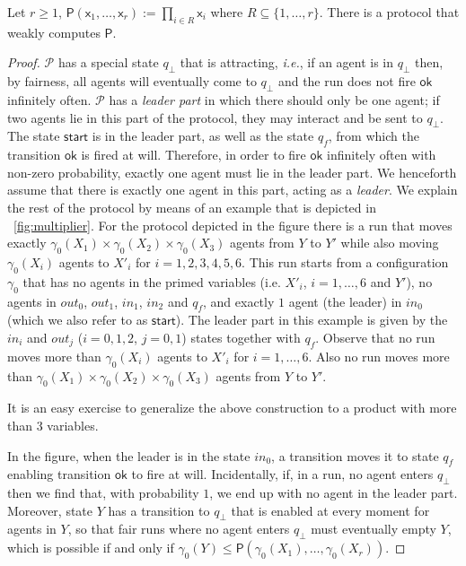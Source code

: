 \documentclass[10pt,a4paper]{article}
\renewcommand{\geq}{\geqslant}
\renewcommand{\leq}{\leqslant}
\newcommand{\prot}{\mathcal{P}}
\newcommand{\config}{\gamma}
\newcommand*{\apoly}{\mathsf{P}}
\newcommand{\varx}{\mathsf{x}}
\newcommand*{\startstate}{\mathsf{start}}
\newcommand*{\statex}[1]{X_{#1}}
\newcommand*{\okaction}{\mathsf{ok}}
\newcommand*{\okstate}{q_f}
\newcommand{\statey}{Y}
\newcommand{\cheatstate}{q_\bot}
\begin{document}
\begin{toappendix}
	\begin{lemma}
		\label{prot-weakly-computes-product}
		Let \(r \geq 1\), \(\apoly(\varx_1, \dots, \varx_r) := \prod_{i\in R} \varx_i\) where \(R\subseteq \{1,\ldots,r\}\).
		There is a protocol that weakly computes \(\apoly\).
	\end{lemma}
	\begin{proof}
		\(\prot\) has a special state \(\cheatstate\) that is attracting, \emph{i.e.}, if an agent is in \(\cheatstate\) then, by fairness, all agents will eventually come to \(\cheatstate\) and the run does not fire \(\okaction\) infinitely often.
		\(\prot\) has a \emph{leader part} in which there should only be one agent; if two agents lie in this part of the protocol, they may interact and be sent to \(\cheatstate\).
		The state \(\startstate\) is in the leader part, as well as the state \(\okstate\), from which the transition \(\okaction\) is fired at will.
		Therefore, in order to fire \(\okaction\) infinitely often with non-zero probability, exactly one agent must lie in the leader part.
		We henceforth assume that there is exactly one agent in this part, acting as a \emph{leader}.
		We explain the rest of the protocol by means of an example that is depicted in \figurename~\ref{fig:multiplier}.
		For the protocol depicted in the figure there is a run that moves exactly \(\gamma_0(X_1) \times \gamma_0(X_2) \times \gamma_0(X_3)\) agents from \(Y\) to \(Y'\) while also moving \(\gamma_0(X_i)\) agents to \(X'_i\) for \(i=1,2,3,4,5,6\).
		This run starts from a configuration \(\gamma_0\) that has no agents in the primed variables (i.e. \(X'_i\), \(i=1,\ldots,6\) and \(Y'\)), no agents in \(out_0\), \(out_1\), \(in_1\), \(in_2\) and \(q_f\), and exactly \(1\) agent (the leader) in \(in_0\) (which we also refer to as \(\startstate\)).
		The leader part in this example is given by the \(in_i\) and \(out_j\) (\(i=0,1,2\), \(j=0,1\)) states together with \(q_f\).
		Observe that no run moves more than \(\gamma_0(X_i)\) agents to \(X'_i\) for \(i=1,\ldots,6\).
		Also no run moves more than \(\gamma_0(X_1) \times \gamma_0(X_2) \times \gamma_0(X_3)\) agents from \(Y\) to \(Y'\).

		It is an easy exercise to generalize the above construction to a product with more than 3 variables.

		In the figure, when the leader is in the state \(in_0\), a transition moves it to state \(q_f\) enabling transition \(\okaction\) to fire at will.
		Incidentally, if, in a run, no agent enters \(\cheatstate\) then we find that, with probability \(1\), we end up with no agent in the leader part.
		Moreover, state \(Y\) has a transition to \(\cheatstate\) that is enabled at every moment for agents in \(Y\), so that fair runs where no agent enters \(\cheatstate\) must eventually empty \(Y\), which is possible if and only if \(\config_0(\statey) \leq \apoly(\config_0(\statex{1}), \dots, \config_0(\statex{r}))\).


\end{proof}
\end{toappendix}
\end{document}
